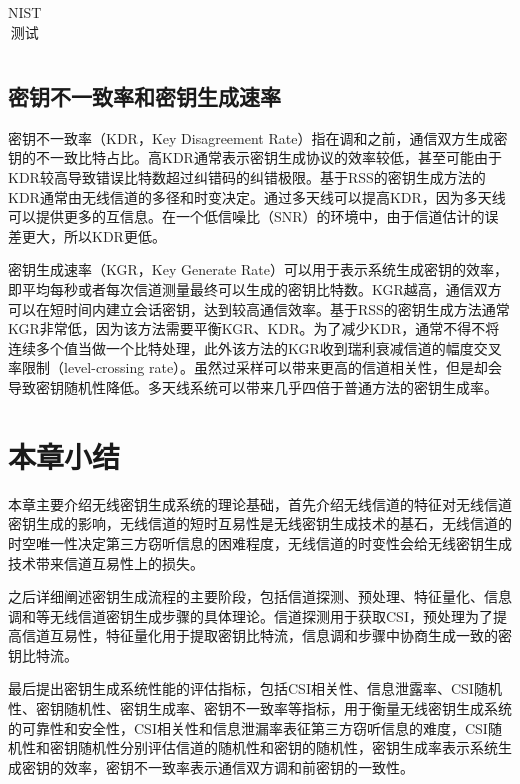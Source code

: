 \documentclass[master]{seuthesis} %
\begin{document}
\begin{Main}
\begin{table}[]
\begin{tabular}{p{70pt}p{70pt}p{200pt}p{100pt}}
    \end{tabular}
    \caption{NIST测试
    \label{NIST-schemes}}
\end{table}

\subsection{密钥不一致率和密钥生成速率}

密钥不一致率（KDR，Key Disagreement Rate）指在调和之前，通信双方生成密钥的不一致比特占比。高KDR通常表示密钥生成协议的效率较低，甚至可能由于KDR较高导致错误比特数超过纠错码的纠错极限。基于RSS的密钥生成方法的KDR通常由无线信道的多径和时变决定\cite{jana2009effectiveness}。通过多天线可以提高KDR，因为多天线可以提供更多的互信息。在一个低信噪比（SNR）的环境中，由于信道估计的误差更大，所以KDR更低。

密钥生成速率（KGR，Key Generate Rate）可以用于表示系统生成密钥的效率，即平均每秒或者每次信道测量最终可以生成的密钥比特数。KGR越高，通信双方可以在短时间内建立会话密钥，达到较高通信效率。基于RSS的密钥生成方法通常KGR非常低，因为该方法需要平衡KGR、KDR。为了减少KDR，通常不得不将连续多个值当做一个比特处理，此外该方法的KGR收到瑞利衰减信道的幅度交叉率限制（level-crossing rate）。虽然过采样可以带来更高的信道相关性，但是却会导致密钥随机性降低\cite{mathur2008radio}。多天线系统可以带来几乎四倍于普通方法的密钥生成率\cite{zeng2010exploiting}。

\section{本章小结}

本章主要介绍无线密钥生成系统的理论基础，首先介绍无线信道的特征对无线信道密钥生成的影响，无线信道的短时互易性是无线密钥生成技术的基石，无线信道的时空唯一性决定第三方窃听信息的困难程度，无线信道的时变性会给无线密钥生成技术带来信道互易性上的损失。

之后详细阐述密钥生成流程的主要阶段，包括信道探测、预处理、特征量化、信息调和等无线信道密钥生成步骤的具体理论。信道探测用于获取CSI，预处理为了提高信道互易性，特征量化用于提取密钥比特流，信息调和步骤中协商生成一致的密钥比特流。

最后提出密钥生成系统性能的评估指标，包括CSI相关性、信息泄露率、CSI随机性、密钥随机性、密钥生成率、密钥不一致率等指标，用于衡量无线密钥生成系统的可靠性和安全性，CSI相关性和信息泄漏率表征第三方窃听信息的难度，CSI随机性和密钥随机性分别评估信道的随机性和密钥的随机性，密钥生成率表示系统生成密钥的效率，密钥不一致率表示通信双方调和前密钥的一致性。


\end{Main}
\end{document}
